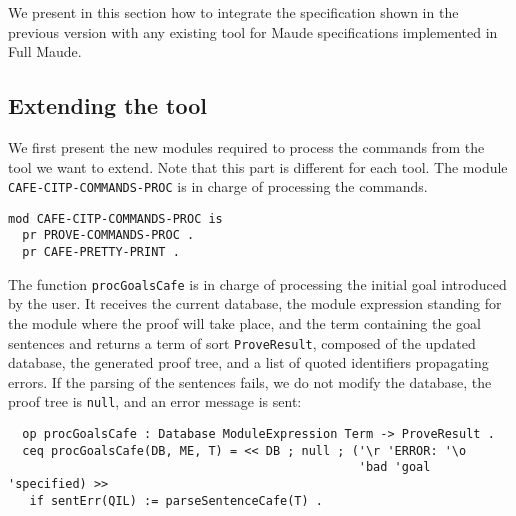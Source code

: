 
We present in this section how to integrate the specification shown in the
previous version with any existing tool for Maude specifications implemented
in Full Maude.

\subsection{Extending the tool\label{subsec:ext}}

We first present the new modules required to process the commands from the tool
we want to extend. Note that this part is different for each tool.
%
The module \verb"CAFE-CITP-COMMANDS-PROC" is in charge of processing the commands.

{\codesize
\begin{verbatim}
mod CAFE-CITP-COMMANDS-PROC is
  pr PROVE-COMMANDS-PROC .
  pr CAFE-PRETTY-PRINT .
\end{verbatim}
}

{\codesize
\begin{comment}
  vars QIL QIL' QIL'' QIL1 QIL2 QIL3 QIL4 QILL QILA PL : QidList .
  vars T T' T'' T''' T1 T2 T3 TW TW' : Term .
  vars ODS ODS' ODS'' VDS : OpDeclSet .
  vars St St' St'' St''' : String .
  vars ME ME' : ModuleExpression .
  vars ScS ScS' : SentenceSet .
  vars EqS EqS' : EquationSet .
  vars TL TL' TL'' : TermList .
  var  SSDS : SubsortDeclSet .
  vars AtS AtS' : AttrSet .
  vars Q Q' GID QI : Qid .
  vars PS PS' : PTreeSet .
  vars RS RS' : RuleSet .
  var  COND : Condition .
  vars M M' FM : Module .
  var  RP : ResultPair .
  var  IL : ImportList .
  var  MAS : MembAxSet .
  var  Snt : Sentence .
  var  DB : Database .
  var  Ct : Constant .
  var  C : Condition .
  var  V : Variable .
  var  SS : SortSet .
  vars P P' : PTree .
  vars B B' : Bool .
  vars N N' : Nat .
  var  H : Header .
  var  L : Label .
  var  S : Sort .
  var  G : Goal .
\end{comment}
}

The function \verb"procGoalsCafe" is in charge of processing the initial goal
introduced by the user. It receives the current database, the module expression
standing for the module where the proof will take place, and the term containing
the goal sentences and returns a term of sort \verb"ProveResult", composed of
the updated database, the generated proof tree, and a list of quoted identifiers
propagating errors.
%
If the parsing of the sentences fails, we do not modify the database, the proof
tree is \verb"null", and an error message is sent:

{\codesize
\begin{verbatim}
  op procGoalsCafe : Database ModuleExpression Term -> ProveResult .
  ceq procGoalsCafe(DB, ME, T) = << DB ; null ; ('\r 'ERROR: '\o
                                                 'bad 'goal 'specified) >>
   if sentErr(QIL) := parseSentenceCafe(T) .
\end{verbatim}
}

